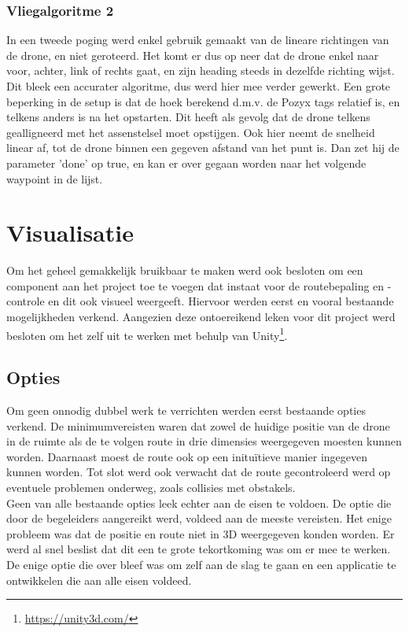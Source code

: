 \subsubsection{Vliegalgoritme 2}
In een tweede poging werd enkel gebruik gemaakt van de lineare richtingen van de drone, en niet geroteerd.
Het komt er dus op neer dat de drone enkel naar voor, achter, link of rechts gaat, en zijn heading steeds in dezelfde richting wijst.
Dit bleek een accurater algoritme, dus werd hier mee verder gewerkt.
Een grote beperking in de setup is dat de hoek berekend d.m.v. de Pozyx tags relatief is, en telkens anders is na het opstarten.
Dit heeft als gevolg dat de drone telkens gealligneerd met het assenstelsel moet opstijgen.
Ook hier neemt de snelheid linear af, tot de drone binnen een gegeven afstand van het punt is.
Dan zet hij de parameter 'done' op true, en kan er over gegaan worden naar het volgende waypoint in de lijst.

\section{Visualisatie} \label{sec:visualization}
Om het geheel gemakkelijk bruikbaar te maken werd ook besloten om een component aan het project toe te voegen dat instaat voor de routebepaling en -controle en dit ook visueel weergeeft.
Hiervoor werden eerst en vooral bestaande mogelijkheden verkend.
Aangezien deze ontoereikend leken voor dit project werd besloten om het zelf uit te werken met behulp van Unity\footnote{\url{https://unity3d.com/}}.

\subsection{Opties} \label{sec:opties}
Om geen onnodig dubbel werk te verrichten werden eerst bestaande opties verkend.
De minimumvereisten waren dat zowel de huidige positie van de drone in de ruimte als de te volgen route in drie dimensies weergegeven moesten kunnen worden.
Daarnaast moest de route ook op een inituïtieve manier ingegeven kunnen worden.
Tot slot werd ook verwacht dat de route gecontroleerd werd op eventuele problemen onderweg, zoals collisies met obstakels.\\

Geen van alle bestaande opties leek echter aan de eisen te voldoen.
De optie die door de begeleiders aangereikt werd, voldeed aan de meeste vereisten.
Het enige probleem was dat de positie en route niet in 3D weergegeven konden worden.
Er werd al snel beslist dat dit een te grote tekortkoming was om er mee te werken.
De enige optie die over bleef was om zelf aan de slag te gaan en een applicatie te ontwikkelen die aan alle eisen voldeed.

